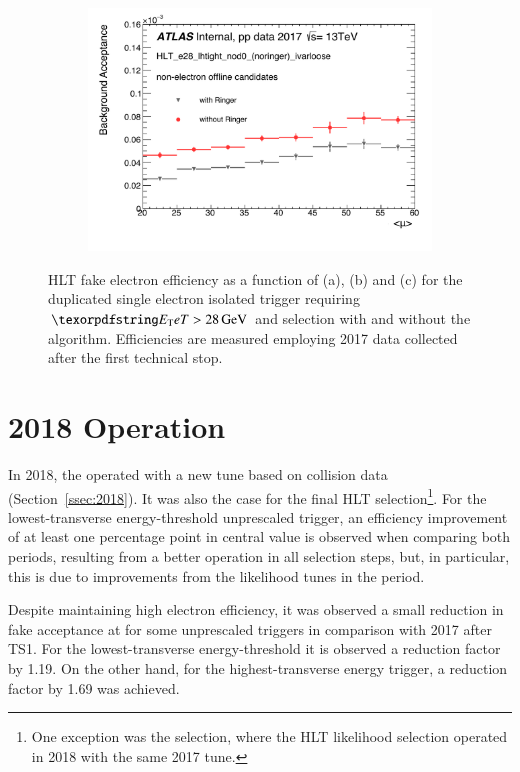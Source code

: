 \begin{figure}[h!tb]
\begin{center}
\begin{subfigure}[c]{.59\textwidth}
\centering
\includegraphics[width=\textwidth]{sections/04_operation/figures/efficiencies/eff_EGAM7_e28_ringer_and_noringer_2017_after_ts1_mu.pdf}
\caption{}
\end{subfigure}
\caption{HLT fake electron efficiency as a function of \et (a), \eta (b) and
\avgmu (c) for the duplicated single electron isolated trigger requiring $\et >
\SI{28}{\GeV}$ and \tight selection with and without the \rnn{} algorithm.
Efficiencies are measured employing 2017 data collected after the first technical stop.}%
\label{fig:e28_triggers_fake_hlt}
\end{center}
\end{figure}


\FloatBarrier

\section{2018 Operation}\label{ssec:2018_ringer_operation}

In 2018, the \rnn{} operated with a new tune based on collision data
(Section~\ref{ssec:2018}). It was also the case for the final HLT
selection\footnote{One exception was the \medium{} selection, where the HLT
likelihood selection operated in 2018 with the same 2017 tune.}. For the
lowest-transverse energy-threshold unprescaled trigger, an efficiency
improvement of at least one percentage point in central value is observed when
comparing both periods, resulting from a better operation in all selection
steps, but, in particular, this is due to improvements from the likelihood tunes in the period.

Despite maintaining high electron efficiency, it was observed a small reduction in fake acceptance at \fastcalo{} for some unprescaled triggers in comparison with 2017 after TS1. For the lowest-transverse energy-threshold it is observed a reduction factor by 1.19. On the other hand, for the highest-transverse energy trigger, a reduction factor by 1.69 was achieved.


